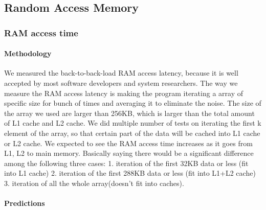 \subsection{Random Access Memory}

\subsubsection{RAM access time}
\paragraph{Methodology}
We measured the back-to-back-load RAM access latency, because it is well accepted by most software developers and system researchers. The way we measure the RAM access latency is making the program iterating a array of specific size for bunch of times and averaging it to eliminate the noise. The size of the array we used are larger than 256KB, which is larger than the total amount of L1 cache and L2 cache. We did multiple number of tests on iterating the first k element of the array, so that certain part of the data will be cached into L1 cache or L2 cache.
We expected to see the RAM access time increases as it goes from L1, L2 to main memory. Basically saying there would be a significant difference among the following three cases: 
1. iteration of the first 32KB data or less (fit into L1 cache)
2. iteration of the first 288KB data or less (fit into L1+L2 cache)
3. iteration of all the whole array(doesn’t fit into caches).
\paragraph{Predictions}
